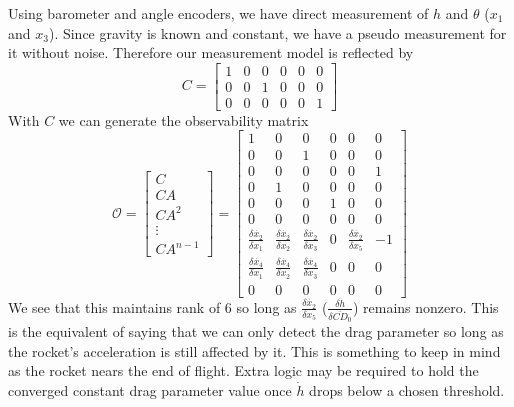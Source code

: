 \documentclass{article}
\begin{document}
  Using barometer and angle encoders, we have direct measurement of $h$ and $\theta$ ($x_1$ and $x_3$). Since gravity is known and constant, we have a pseudo measurement for it without noise. Therefore our measurement model is reflected by
  \begin{equation}
    C = \left[\begin{matrix} 1 & 0 & 0 & 0 & 0 & 0  \\
                             0 & 0 & 1 & 0 & 0 & 0  \\
                             0 & 0 & 0 & 0 & 0 & 1              \end{matrix}\right]
  \end{equation}
  With $C$ we can generate the observability matrix
  \begin{equation}
    \mathcal O = \left[\begin{matrix} C  \\
                                      CA  \\
                                      CA^2 \\
                                      \vdots \\
                                      CA^{n-1}            \end{matrix}\right]
               = \left[\begin{matrix} 1 & 0 & 0 & 0 & 0 & 0  \\
                                      0 & 0 & 1 & 0 & 0 & 0  \\
                                      0 & 0 & 0 & 0 & 0 & 1  \\
                                      0 & 1 & 0 & 0 & 0 & 0  \\
                                      0 & 0 & 0 & 1 & 0 & 0  \\
                                      0 & 0 & 0 & 0 & 0 & 0  \\
                                      \frac{\delta \dot{x_2}}{\delta x_1}& \frac{\delta \dot{x_2}}{\delta x_2}& \frac{\delta \dot{x_2}}{\delta x_3}& 0& \frac{\delta \dot{x_2}}{\delta x_5}& -1 \\
                                      \frac{\delta \dot{x_4}}{\delta x_1}& \frac{\delta \dot{x_4}}{\delta x_2}& \frac{\delta \dot{x_4}}{\delta x_3}& 0&   0&  0 \\
                                      0  &   0&   0& 0&   0&  0 \end{matrix}\right]
  \end{equation}
  We see that this maintains rank of 6 so long as $\frac{\delta \dot{x_2}}{\delta x_5}$ ($\frac{\delta \ddot{h}}{\delta \bar{CD}_0}$) remains nonzero. This is the equivalent of saying that we can only detect the drag parameter so long as the rocket's acceleration is still affected by it. This is something to keep in mind as the rocket nears the end of flight. Extra logic may be required to hold the converged constant drag parameter value once $\dot{h}$ drops below a chosen threshold.
\end{document}
